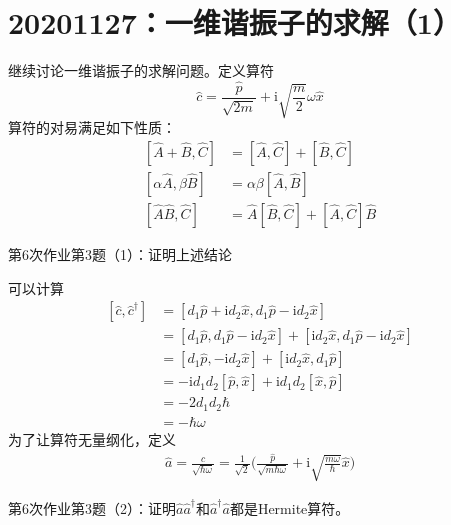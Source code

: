     \section{20201127：一维谐振子的求解（1）}
        继续讨论一维谐振子的求解问题。定义算符
        \[ \hat{c} = \frac {\hat{p}}{\sqrt{2m}} + \mathrm{i}\sqrt{\frac m2}\omega \hat{x} \]
        算符的对易满足如下性质：
        \begin{equation}\begin{aligned}
            [\hat{A}+\hat{B},\hat{C}] &= [\hat{A},\hat{C}]+[\hat{B},\hat{C}]\\
            [\alpha \hat{A}, \beta \hat{B}] &= \alpha \beta [\hat{A},\hat{B}]\\
            [\hat{A}\hat{B},\hat{C}] &= \hat{A}[\hat{B},\hat{C}] + [\hat{A},\hat{C}]\hat{B}
        \end{aligned}\end{equation}
        \begin{asg}
            第6次作业第3题（1）：证明上述结论
        \end{asg}
        可以计算
        \begin{equation}\begin{aligned}
            [\hat{c},\hat{c}^\dagger] &= [d_1\hat{p} +\mathrm{i}d_2\hat{x}, d_1\hat{p} - \mathrm{i}d_2\hat{x}]\\
            &= [d_1\hat{p}, d_1\hat{p} - \mathrm{i}d_2\hat{x}] + [\mathrm{i}d_2\hat{x}, d_1\hat{p} - \mathrm{i}d_2\hat{x}]\\
            &= [d_1\hat{p}, -\mathrm{i}d_2\hat{x}] + [\mathrm{i}d_2\hat{x}, d_1\hat{p}]\\
            &= -\mathrm{i}d_1d_2[\hat{p},\hat{x}] + \mathrm{i}d_1d_2[\hat{x},\hat{p}]\\
            &= -2d_1d_2\hbar\\
            &= -\hbar \omega
        \end{aligned}\end{equation}
        为了让算符无量纲化，定义
        \begin{equation}\begin{aligned}
            \hat{a} = \frac {\hat{c}}{\sqrt{\hbar \omega}} =\frac 1{\sqrt{2}} \bigg(\frac {\hat{p}}{\sqrt{m\hbar\omega}} + \mathrm{i}\sqrt{\frac {m\omega}{\hbar}} \hat{x}\bigg)
        \end{aligned}\end{equation}
        \begin{asg}
            第6次作业第3题（2）：证明$\hat{a}\hat{a}^\dagger$和$\hat{a}^\dagger\hat{a}$都是Hermite算符。
        \end{asg}
